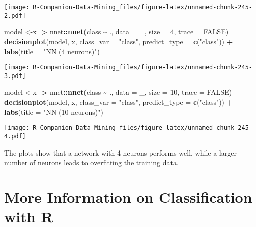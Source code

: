 \documentclass[
  notitlepage]{book}
\newenvironment{Shaded}{\begin{snugshade}}{\end{snugshade}}
\newcommand{\DataTypeTok}[1]{\textcolor[rgb]{0.13,0.29,0.53}{#1}}
\newcommand{\DecValTok}[1]{\textcolor[rgb]{0.00,0.00,0.81}{#1}}
\newcommand{\ErrorTok}[1]{\textcolor[rgb]{0.64,0.00,0.00}{\textbf{#1}}}
\newcommand{\KeywordTok}[1]{\textcolor[rgb]{0.13,0.29,0.53}{\textbf{#1}}}
\newcommand{\NormalTok}[1]{#1}
\newcommand{\OperatorTok}[1]{\textcolor[rgb]{0.81,0.36,0.00}{\textbf{#1}}}
\newcommand{\OtherTok}[1]{\textcolor[rgb]{0.56,0.35,0.01}{#1}}
\newcommand{\StringTok}[1]{\textcolor[rgb]{0.31,0.60,0.02}{#1}}
\begin{document}
\texttt{[image: R-Companion-Data-Mining\_files/figure-latex/unnamed-chunk-245-2.pdf]}

\begin{Shaded}
\begin{Highlighting}[]
\NormalTok{model \textless{}{-}x }\OperatorTok{|}\ErrorTok{\textgreater{}}\StringTok{ }\NormalTok{nnet}\OperatorTok{::}\KeywordTok{nnet}\NormalTok{(class }\OperatorTok{\textasciitilde{}}\StringTok{ }\NormalTok{., }\DataTypeTok{data =}\NormalTok{ \_, }\DataTypeTok{size =} \DecValTok{4}\NormalTok{, }\DataTypeTok{trace =} \OtherTok{FALSE}\NormalTok{)}
\KeywordTok{decisionplot}\NormalTok{(model, x, }\DataTypeTok{class\_var =} \StringTok{"class"}\NormalTok{, }
  \DataTypeTok{predict\_type =} \KeywordTok{c}\NormalTok{(}\StringTok{"class"}\NormalTok{)) }\OperatorTok{+}\StringTok{ }\KeywordTok{labs}\NormalTok{(}\DataTypeTok{title =} \StringTok{"NN (4 neurons)"}\NormalTok{)}
\end{Highlighting}
\end{Shaded}

\texttt{[image: R-Companion-Data-Mining\_files/figure-latex/unnamed-chunk-245-3.pdf]}

\begin{Shaded}
\begin{Highlighting}[]
\NormalTok{model \textless{}{-}x }\OperatorTok{|}\ErrorTok{\textgreater{}}\StringTok{ }\NormalTok{nnet}\OperatorTok{::}\KeywordTok{nnet}\NormalTok{(class }\OperatorTok{\textasciitilde{}}\StringTok{ }\NormalTok{., }\DataTypeTok{data =}\NormalTok{ \_, }\DataTypeTok{size =} \DecValTok{10}\NormalTok{, }\DataTypeTok{trace =} \OtherTok{FALSE}\NormalTok{)}
\KeywordTok{decisionplot}\NormalTok{(model, x, }\DataTypeTok{class\_var =} \StringTok{"class"}\NormalTok{, }
  \DataTypeTok{predict\_type =} \KeywordTok{c}\NormalTok{(}\StringTok{"class"}\NormalTok{)) }\OperatorTok{+}\StringTok{ }\KeywordTok{labs}\NormalTok{(}\DataTypeTok{title =} \StringTok{"NN (10 neurons)"}\NormalTok{)}
\end{Highlighting}
\end{Shaded}

\texttt{[image: R-Companion-Data-Mining\_files/figure-latex/unnamed-chunk-245-4.pdf]}

The plots show that a network with 4 neurons performs well, while
a larger number of neurons leads to overfitting the training data.

\hypertarget{more-information-on-classification-with-r}{%
\section{More Information on Classification with R}\label{more-information-on-classification-with-r}}
\end{document}
